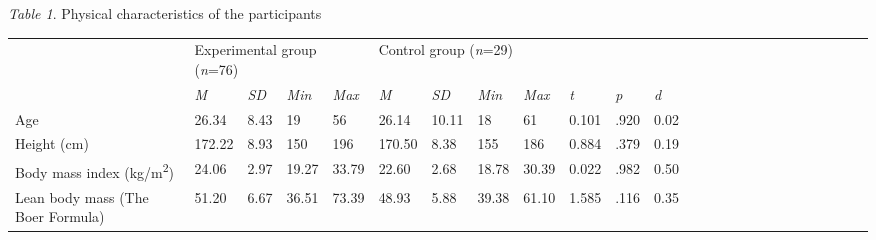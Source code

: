 \documentclass[authordate, empirical]{jote-new-article}
\begin{document}
\emph{Table 1}. Physical characteristics of the participants

\begin{table}
  \begin{tabularx}{\linewidth}{@{} l l l l l l l l l l l l l l  l l l l l l l l l l l@{}}
    \hline                                          & \multicolumn{4}{l}{Experimental group (\emph{n}=76)} &
    \multicolumn{4}{l}{Control group (\emph{n}=29)} &                                                      &            &                                                                            \\

                                                    & \emph{M}                                             & \emph{SD}  & \emph{Min} & \emph{Max} & \emph{M} & \emph{SD}
                                                    & \emph{Min}                                           & \emph{Max} & \emph{t}   & \emph{p}   & \emph{d}                                         \\

    \hline Age                                      & 26.34                                                & 8.43       & 19         & 56         & 26.14    & 10.11     & 18   & 61  & 0.101 & .920
                                                    & 0.02                                                                                                                                           \\

    Height (cm)                                     & 172.22                                               & 8.93       & 150        & 196        & 170.50   & 8.38      & 155  & 186 & 0.884
                                                    & .379                                                 & 0.19                                                                                    \\

    Body mass index (kg/m\textsuperscript{2})       & 24.06                                                & 2.97       & 19.27      & 33.79
                                                    & 22.60                                                & 2.68       & 18.78      & 30.39      & 0.022    & .982      & 0.50                      \\

    Lean body mass (The Boer Formula)               & 51.20                                                & 6.67       & 36.51      & 73.39      & 48.93
                                                    & 5.88                                                 & 39.38      & 61.10      & 1.585      & .116     & 0.35                                  \\
  \end{tabularx}
\end{table}
\end{document}
